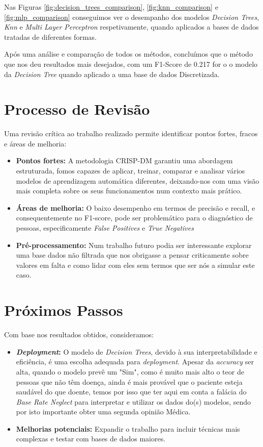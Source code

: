 Nas Figuras \ref{fig:decision_trees_comparison}, \ref{fig:knn_comparison} e \ref{fig:mlp_comparison} conseguimos ver o desempanho dos modelos \textit{Decision Trees}, \textit{Knn} e \textit{Multi Layer Perceptron} respetivamente, quando aplicados a bases de dados tratadas de diferentes formas.

Após uma análise e comparação de todos os métodos, concluímos que o método que nos deu resultados mais desejados, com um F1-Score de 0.217 for o o modelo da \textit{Decision Tree} quando aplicado a uma base de dados Discretizada.

\section{Processo de Revisão}
\label{chap:ev:review}

Uma revisão crítica ao trabalho realizado permite identificar pontos fortes, fracos e áreas de melhoria:
\begin{itemize}
    \item \textbf{Pontos fortes:} A metodologia CRISP-DM garantiu uma abordagem estruturada, fomos capazes de aplicar, treinar, comparar e analisar vários modelos de aprendizagem automática diferentes, deixando-nos com uma visão mais completa sobre os seus funcionamentos num contexto mais prático.
    \item \textbf{Áreas de melhoria:} O baixo desempenho em termos de precisão e recall, e consequentemente no F1-score, pode ser problemático para o diagnóstico de pessoas, especificamente \textit{False Positives} e \textit{True Negatives}
    \item \textbf{Pré-processamento:} Num trabalho futuro podia ser interessante explorar uma base dados não filtrada que nos obrigasse a pensar criticamente sobre valores em falta e como lidar com eles sem termos que ser nós a simular este caso.
\end{itemize}

\section{Próximos Passos}
\label{chap:ev:next_steps}

Com base nos resultados obtidos, consideramos:
\begin{itemize}
    \item \textbf{\textit{Deployment}:} O modelo de \textit{Decision Trees}, devido à sua interpretabilidade e eficiência, é uma escolha adequada para \textit{deployment}. Apesar da \textit{accuracy} ser alta, quando o modelo prevê um "Sim", como é muito mais alto o teor de pessoas que não têm doença, ainda é mais provável que o paciente esteja saudável do que doente, temos por isso que ter aqui em conta a falácia do \textit{Base Rate Neglect}\cite{wikipedia_base_rate_fallacy} para interpretar e utilizar os dados do(s) modelos, sendo por isto importante obter uma segunda opinião Médica. 
    \item \textbf{Melhorias potenciais:} Expandir o trabalho para incluir técnicas mais complexas e testar com bases de dados maiores.
\end{itemize}
